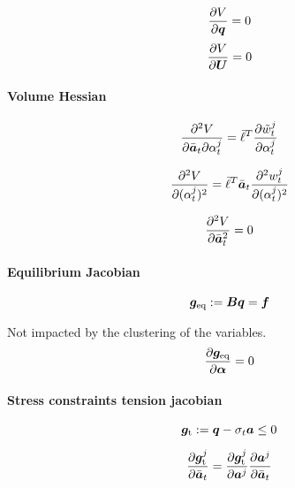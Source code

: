 \begin{equation}
    \frac{\partial V}{\partial\bm{q}}=0
\end{equation}
\begin{equation}
    \frac{\partial V}{\partial\bm{U}}=0
\end{equation}


\paragraph*{Volume Hessian} 

\begin{equation}
    \frac{\partial^2V}{\partial{\bar{\bm{a}}_t}\partial\alpha_t^j} = \bar{\ell}^T \frac{\partial\tilde{w}_t^j}{\partial\alpha_t^j}
\end{equation}

\begin{equation}
    \frac{\partial^2V}{\partial(\alpha_t^j)^2} = \bar{\ell}^T \bar{\bm{a}}_t \frac{\partial^2w_t^j}{\partial(\alpha_t^j)^2}
\end{equation}

\begin{equation}
    \frac{\partial^2V}{\partial{\bar{\bm{a}}_t}^2} = 0
\end{equation}

\paragraph*{Equilibrium Jacobian}
\begin{equation}
    \bm{g}_\text{eq}:=\bm{B}\bm{q} = \bm{f}
\end{equation}

Not impacted by the clustering of the variables.
\begin{equation}
    \frac{\partial\bm{g}_\text{eq}}{\partial\bm{\alpha}}=0
\end{equation}

\paragraph*{Stress constraints tension jacobian}

\begin{equation}
    \bm{g}_\text{t}:=\bm{q} -\sigma_t\bm{a} \leq 0
\end{equation}

\begin{equation}
    \frac{\partial\bm{g}_\text{t}^j}{\partial\bar{\bm{a}}_t} = \frac{\partial\bm{g}_\text{t}^j}{\partial{\bm{a}^j}} \frac{\partial\bm{a}^j}{\partial\bar{\bm{a}}_t}
\end{equation}

